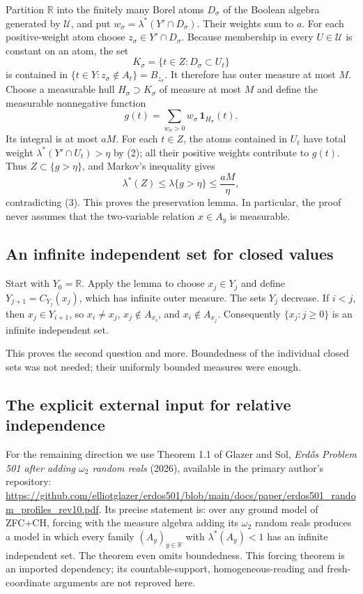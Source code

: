 Partition $\mathbb R$ into the finitely many Borel atoms $D_\sigma$ of the Boolean algebra generated by $\mathcal U$, and put
$w_\sigma=\lambda^*(Y'\cap D_\sigma)$. Their weights sum to $a$. For each positive-weight atom choose $z_\sigma\in Y'\cap D_\sigma$. Because membership in every $U\in\mathcal U$ is constant on an atom, the set
\[
 K_\sigma=\{t\in Z:D_\sigma\subset U_t\}
\]
is contained in $\{t\in Y:z_\sigma\notin A_t\}=B_{z_\sigma}$. It therefore has outer measure at most $M$. Choose a measurable hull $H_\sigma\supset K_\sigma$ of measure at most $M$ and define the measurable nonnegative function
\[
 g(t)=\sum_{w_\sigma>0}w_\sigma\,\mathbf1_{H_\sigma}(t).
\]
Its integral is at most $aM$. For each $t\in Z$, the atoms contained in $U_t$ have total weight $\lambda^*(Y'\cap U_t)>\eta$ by (2); all their positive weights contribute to $g(t)$. Thus $Z\subset\{g>\eta\}$, and Markov's inequality gives
\[
 \lambda^*(Z)\le\lambda\{g>\eta\}\le\frac{aM}{\eta},
\]
contradicting (3). This proves the preservation lemma. In particular, the proof never assumes that the two-variable relation $x\in A_y$ is measurable.

\subsection*{An infinite independent set for closed values}
Start with $Y_0=\mathbb R$. Apply the lemma to choose $x_j\in Y_j$ and define
$Y_{j+1}=C_{Y_j}(x_j)$, which has infinite outer measure. The sets $Y_j$ decrease. If $i<j$, then $x_j\in Y_{i+1}$, so $x_i\ne x_j$, $x_j\notin A_{x_i}$, and $x_i\notin A_{x_j}$. Consequently $\{x_j:j\ge0\}$ is an infinite independent set.

This proves the second question and more. Boundedness of the individual closed sets was not needed; their uniformly bounded measures were enough.

\subsection*{The explicit external input for relative independence}
For the remaining direction we use Theorem 1.1 of Glazer and Sol, \emph{Erd\H{o}s Problem 501 after adding $\omega_2$ random reals} (2026), available in the primary author's repository:
\url{https://github.com/elliotglazer/erdos501/blob/main/docs/paper/erdos501_random_profiles_rev10.pdf}.
Its precise statement is: over any ground model of ZFC+CH, forcing with the measure algebra adding its $\omega_2$ random reals produces a model in which every family $(A_y)_{y\in\mathbb R}$ with $\lambda^*(A_y)<1$ has an infinite independent set. The theorem even omits boundedness. This forcing theorem is an imported dependency; its countable-support, homogeneous-reading and fresh-coordinate arguments are not reproved here.

